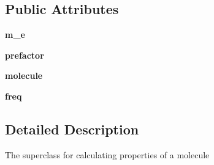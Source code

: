 \subsection*{Public Attributes}
\begin{DoxyCompactItemize}
\item 
\hypertarget{classProperty_1_1Property_a081689db7731edaf89f3d7a3e1f78680}{{\bfseries m\+\_\+e}}\label{classProperty_1_1Property_a081689db7731edaf89f3d7a3e1f78680}

\item 
\hypertarget{classProperty_1_1Property_a2b1de8d9b1024c2d09cccb837b8ba803}{{\bfseries prefactor}}\label{classProperty_1_1Property_a2b1de8d9b1024c2d09cccb837b8ba803}

\item 
\hypertarget{classProperty_1_1Property_a076e81d95a892945d0e96cd3e1618553}{{\bfseries molecule}}\label{classProperty_1_1Property_a076e81d95a892945d0e96cd3e1618553}

\item 
\hypertarget{classProperty_1_1Property_acc63967a91b7bbc8cf8e51f1fabd2910}{{\bfseries freq}}\label{classProperty_1_1Property_acc63967a91b7bbc8cf8e51f1fabd2910}

\end{DoxyCompactItemize}


\subsection{Detailed Description}
\begin{DoxyVerb}The superclass for calculating properties of a molecule\end{DoxyVerb}
 


